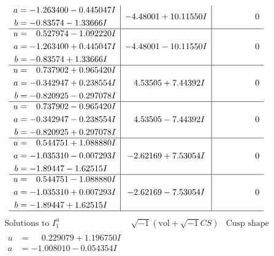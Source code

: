 \documentclass[1p]{elsarticle_modified}
\theoremstyle{definition}
\newcommand{\I}{\sqrt{-1}}
\begin{document}
$$\begin{array}{c|c|c}
\begin{aligned}
a &= -1.263400 - 0.445047 I \\
b &= -0.83574 - 1.33666 I\end{aligned}
 & -4.48001 + 10.11550 I & \phantom{-0.000000 } 0 \\ \hline\begin{aligned}
u &= \phantom{-}0.527974 - 1.092220 I \\
a &= -1.263400 + 0.445047 I \\
b &= -0.83574 + 1.33666 I\end{aligned}
 & -4.48001 - 10.11550 I & \phantom{-0.000000 } 0 \\ \hline\begin{aligned}
u &= \phantom{-}0.737902 + 0.965420 I \\
a &= -0.342947 + 0.238554 I \\
b &= -0.820925 - 0.297078 I\end{aligned}
 & \phantom{-}4.53505 + 7.44392 I & \phantom{-0.000000 } 0 \\ \hline\begin{aligned}
u &= \phantom{-}0.737902 - 0.965420 I \\
a &= -0.342947 - 0.238554 I \\
b &= -0.820925 + 0.297078 I\end{aligned}
 & \phantom{-}4.53505 - 7.44392 I & \phantom{-0.000000 } 0 \\ \hline\begin{aligned}
u &= \phantom{-}0.544751 + 1.088880 I \\
a &= -1.035310 - 0.007293 I \\
b &= -1.89447 - 1.62515 I\end{aligned}
 & -2.62169 + 7.53054 I & \phantom{-0.000000 } 0 \\ \hline\begin{aligned}
u &= \phantom{-}0.544751 - 1.088880 I \\
a &= -1.035310 + 0.007293 I \\
b &= -1.89447 + 1.62515 I\end{aligned}
 & -2.62169 - 7.53054 I & \phantom{-0.000000 } 0\\
 \hline 
 \end{array}$$\newpage$$\begin{array}{c|c|c}  
\text{Solutions to }I^u_{1}& \I (\text{vol} + \sqrt{-1}CS) & \text{Cusp shape}\\
 \hline 
\begin{aligned}
u &= \phantom{-}0.229079 + 1.196750 I \\
a &= -1.008010 - 0.054354 I \\

\end{aligned}
\end{array}$$
\end{document}
